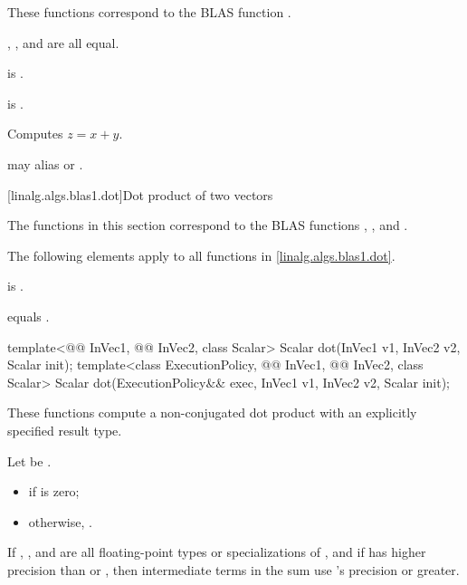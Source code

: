 \begin{itemdescr}
\pnum
\begin{note}
These functions correspond to the BLAS function .
\end{note}

\pnum
\constraints
{}, , and  are all equal.

\pnum
\mandates
{} is .

\pnum
\expects
{} is .

\pnum
\effects
Computes $z = x + y$.

\pnum
\remarks
{} may alias  or .
\end{itemdescr}

[linalg.algs.blas1.dot]{Dot product of two vectors}

\pnum
\begin{note}
The functions in this section correspond to the BLAS
functions , , and .
\end{note}

\pnum
The following elements apply to all functions in \ref{linalg.algs.blas1.dot}.

\pnum
\mandates
{} is .

\pnum
\expects
{} equals .
\begin{itemdecl}
template<@@ InVec1, @@ InVec2, class Scalar>
  Scalar dot(InVec1 v1, InVec2 v2, Scalar init);
template<class ExecutionPolicy, @@ InVec1, @@ InVec2, class Scalar>
  Scalar dot(ExecutionPolicy&& exec,
             InVec1 v1, InVec2 v2, Scalar init);
\end{itemdecl}

\begin{itemdescr}
\pnum
These functions compute a non-conjugated dot product
with an explicitly specified result type.

\pnum
\returns
Let  be .
\begin{itemize}
\item
{} if  is zero;
\item
otherwise,
.
\end{itemize}

\pnum
\remarks
If , , and 
are all floating-point types or specializations of ,
and if  has higher precision
than  or ,
then intermediate terms in the sum use 's precision or greater.
\end{itemdescr}

